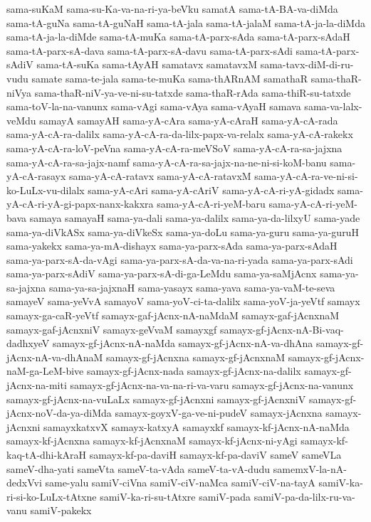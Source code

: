 {sama-suKaM
sama-su-Ka-va-na-ri-ya-beVku
samatA
sama-tA-BA-va-diMda
sama-tA-guNa
sama-tA-guNaH
sama-tA-jala
sama-tA-jalaM
sama-tA-ja-la-diMda
sama-tA-ja-la-diMde
sama-tA-muKa
sama-tA-parx-sAda
sama-tA-parx-sAdaH
sama-tA-parx-sA-dava
sama-tA-parx-sA-davu
sama-tA-parx-sAdi
sama-tA-parx-sAdiV
sama-tA-suKa
sama-tAyAH
samatavx
samatavxM
sama-tavx-diM-di-ru-vudu
samate
sama-te-jala
sama-te-muKa
sama-thARnAM
samathaR
sama-thaR-niVya
sama-thaR-niV-ya-ve-ni-su-tatxde
sama-thaR-rAda
sama-thiR-su-tatxde
sama-toV-la-na-vanunx
sama-vAgi
sama-vAya
sama-vAyaH
samava
sama-va-lalx-veMdu
samayA
samayAH
sama-yA-cAra
sama-yA-cAraH
sama-yA-cA-rada
sama-yA-cA-ra-dalilx
sama-yA-cA-ra-da-lilx-papx-va-relalx
sama-yA-cA-rakekx
sama-yA-cA-ra-loV-peVna
sama-yA-cA-ra-meVSoV
sama-yA-cA-ra-sa-jajxna
sama-yA-cA-ra-sa-jajx-namf
sama-yA-cA-ra-sa-jajx-na-ne-ni-si-koM-banu
sama-yA-cA-rasayx
sama-yA-cA-ratavx
sama-yA-cA-ratavxM
sama-yA-cA-ra-ve-ni-si-ko-LuLx-vu-dilalx
sama-yA-cAri
sama-yA-cAriV
sama-yA-cA-ri-yA-gidadx
sama-yA-cA-ri-yA-gi-papx-nanx-kakxra
sama-yA-cA-ri-yeM-baru
sama-yA-cA-ri-yeM-bava
samaya
samayaH
sama-ya-dali
sama-ya-dalilx
sama-ya-da-lilxyU
sama-yade
sama-ya-diVkASx
sama-ya-diVkeSx
sama-ya-doLu
sama-ya-guru
sama-ya-guruH
sama-yakekx
sama-ya-mA-dishayx
sama-ya-parx-sAda
sama-ya-parx-sAdaH
sama-ya-parx-sA-da-vAgi
sama-ya-parx-sA-da-va-na-ri-yada
sama-ya-parx-sAdi
sama-ya-parx-sAdiV
sama-ya-parx-sA-di-ga-LeMdu
sama-ya-saMjAcnx
sama-ya-sa-jajxna
sama-ya-sa-jajxnaH
sama-yasayx
sama-yava
sama-ya-vaM-te-seva
samayeV
sama-yeVvA
samayoV
sama-yoV-ci-ta-dalilx
sama-yoV-ja-yeVtf
samayx
samayx-ga-caR-yeVtf
samayx-gaf-jAcnx-nA-naMdaM
samayx-gaf-jAcnxnaM
samayx-gaf-jAcnxniV
samayx-geVvaM
samayxgf
samayx-gf-jAcnx-nA-Bi-vaq-dadhxyeV
samayx-gf-jAcnx-nA-naMda
samayx-gf-jAcnx-nA-va-dhAna
samayx-gf-jAcnx-nA-va-dhAnaM
samayx-gf-jAcnxna
samayx-gf-jAcnxnaM
samayx-gf-jAcnx-naM-ga-LeM-bive
samayx-gf-jAcnx-nada
samayx-gf-jAcnx-na-dalilx
samayx-gf-jAcnx-na-miti
samayx-gf-jAcnx-na-va-na-ri-va-varu
samayx-gf-jAcnx-na-vanunx
samayx-gf-jAcnx-na-vuLaLx
samayx-gf-jAcnxni
samayx-gf-jAcnxniV
samayx-gf-jAcnx-noV-da-ya-diMda
samayx-goyxV-ga-ve-ni-pudeV
samayx-jAcnxna
samayx-jAcnxni
samayxkatxvX
samayx-katxyA
samayxkf
samayx-kf-jAcnx-nA-naMda
samayx-kf-jAcnxna
samayx-kf-jAcnxnaM
samayx-kf-jAcnx-ni-yAgi
samayx-kf-kaq-tA-dhi-kAraH
samayx-kf-pa-daviH
samayx-kf-pa-daviV
sameV
sameVLa
sameV-dha-yati
sameVta
sameV-ta-vAda
sameV-ta-vA-dudu
samemxV-la-nA-dedxVvi
same-yalu
samiV-ciVna
samiV-ciV-naMca
samiV-ciV-na-tayA
samiV-ka-ri-si-ko-LuLx-tAtxne
samiV-ka-ri-su-tAtxre
samiV-pada
samiV-pa-da-lilx-ru-va-vanu
samiV-pakekx
}

